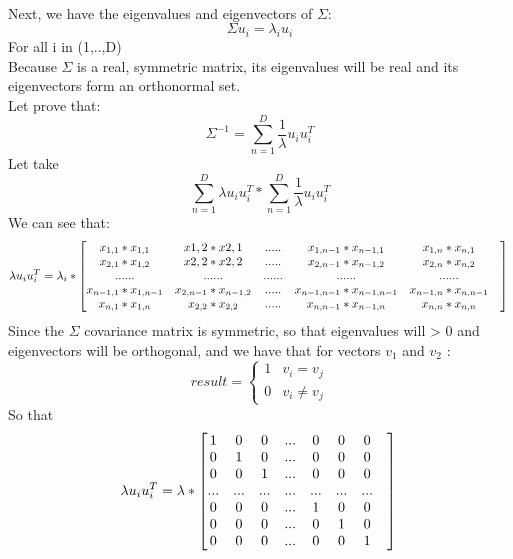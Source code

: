 \documentclass{article}
\begin{document}
        \\
        Next, we have the eigenvalues and eigenvectors of $\Sigma$:
        $$
            \Sigma u_i = \lambda_i u_i
        $$
        For all i in (1,..,D) \\
        Because $\Sigma$ is a real, symmetric matrix, its eigenvalues will be real and its eigenvectors form an orthonormal set.\\
        Let prove that:
        $$
             \Sigma ^{-1} = \sum_{n=1}^{D} \frac{1}{\lambda} u_i u_i^T
        $$
        Let take
        $$
            \sum_{n=1}^{D} \lambda u_i u_i^T * \sum_{n=1}^{D} \frac{1}{\lambda} u_i u_i^T
        $$
        We can see that:
        $$
            \lambda u_i u_i^T = \lambda_i * \begin{bmatrix}
                x_{1,1} * x_{1,1} & x{1,2}*x{2,1} & .....& x_{1,n-1}*x_{n-1,1} & x_{1,n}*x_{n,1}\\
                x_{2,1} * x_{1,2} & x{2,2}*x{2,2} & .....& x_{2,n-1}*x_{n-1,2} & x_{2,n}*x_{n,2}\\
                ......&......&......&......&......&\\
                x_{n-1,1} * x_{1,n-1} & x_{2,n-1} * x_{n-1,2} & ..... & x_{n-1,n-1}*x_{n-1,n-1} & x_{n-1,n}*x_{n,n-1}\\
                x_{n,1} * x_{1,n} & x_{2,2}*x_{2,2}&..... & x_{n,n-1}*x_{n-1,n} & x_{n,n}*x_{n,n}\\
            \end{bmatrix} \\
        $$
        Since the $\Sigma$ covariance matrix is symmetric, so that eigenvalues will > 0 and eigenvectors will be orthogonal, and we have that for vectors $v_1$ and $v_2$ : \\
        $$
        result = \begin{cases}
            1   &   v_i = v_j \\
            0   &   v_i \ne v_j
        \end{cases}
        $$
        So that
        $$
        \lambda u_i u_i^T = \lambda *
        \begin{bmatrix}
            1 & 0 & 0 & ... & 0 & 0 & 0\\
            0 & 1 & 0 & ... & 0 & 0 & 0\\
            0 & 0 & 1 & ... & 0 & 0 & 0\\
            ...&...&...&...&...&...&...&\\
            0 & 0 & 0 & ... & 1 & 0 & 0\\
            0 & 0 & 0 & ... & 0 & 1 & 0\\
            0 & 0 & 0 & ... & 0 & 0 & 1\\
        \end{bmatrix} \\
        $$
\end{document}
